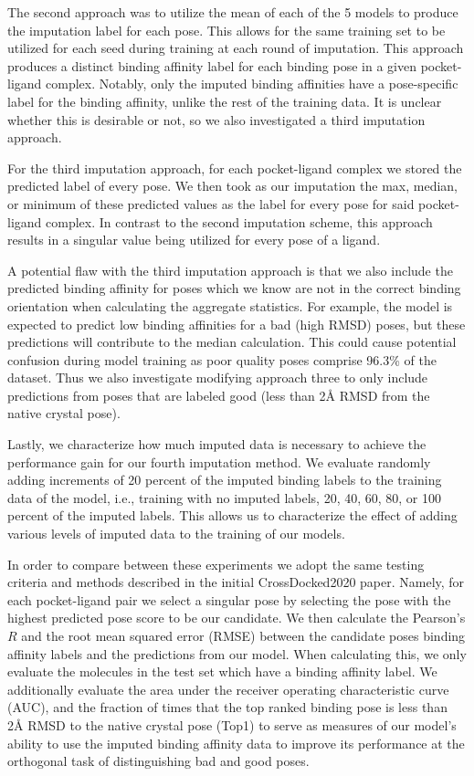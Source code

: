 \documentclass[journal=jmcmar,manuscript=article]{achemso}
\begin{document}
The second approach was to utilize the mean of each of the 5 models to produce the imputation label for each pose.
This allows for the same training set to be utilized for each seed during training at each round of imputation.
This approach produces a distinct binding affinity label for each binding pose in a given pocket-ligand complex.
Notably, only the imputed binding affinities have a pose-specific label for the binding affinity, unlike the rest of the training data.
It is unclear whether this is desirable or not, so we also investigated a third imputation approach.

For the third imputation approach, for each pocket-ligand complex we stored the predicted label of every pose.
We then took as our imputation the max, median, or minimum of these predicted values as the label for every pose for said pocket-ligand complex.
In contrast to the second imputation scheme, this approach results in a singular value being utilized for every pose of a ligand.

A potential flaw with the third imputation approach is that we also include the predicted binding affinity for poses which we know are not in the correct binding orientation when calculating the aggregate statistics.  For example, the model is expected to predict low binding affinities for a bad (high RMSD) poses, but these predictions will contribute to the median calculation.
This could cause potential confusion during model training as poor quality poses  comprise 96.3\% of the dataset.
Thus we also investigate modifying approach three to only include predictions from poses that are labeled good (less than 2{\AA} RMSD from the native crystal pose).

Lastly, we characterize how much imputed data is necessary to achieve the performance gain for our fourth imputation method.
We evaluate randomly adding increments of 20 percent of the imputed binding labels to the training data of the model, i.e., training with no imputed labels, 20, 40, 60, 80, or 100 percent of the imputed labels.
This allows us to characterize the effect of adding various levels of imputed data to the training of our models.

In order to compare between these experiments we adopt the same testing criteria and methods described in the initial CrossDocked2020 paper\cite{crossdocked2020}.
Namely, for each pocket-ligand pair we select a singular pose by selecting the pose with the highest predicted pose score to be our candidate. 
We then calculate the Pearson's $R$ and the root mean squared error (RMSE) between the candidate poses binding affinity labels and the predictions from our model.
When calculating this, we only evaluate the molecules in the test set which have a binding affinity label.
We additionally evaluate the area under the receiver operating characteristic curve (AUC), and the fraction of times that the top ranked binding pose is less than 2{\AA} RMSD to the native crystal pose (Top1) to serve as measures of our model's ability to use the imputed binding affinity data to improve its performance at the orthogonal task of distinguishing bad and good poses.
\end{document}
